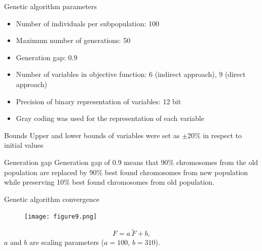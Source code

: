 \documentclass[10pt]{beamer} %
\begin{document}
\begin{frame}[t,label=frame24]{Genetic algorithm parameters}
\begin{itemize}
	\item Number of individuals per subpopulation: 100
	\item Maximum number of generations: 50
	\item Generation gap: 0.9
	\item Number of variables in objective function: 6 (indirect approach), 9 (direct approach)
	\item Precision of binary representation of variables: 12 bit
	\item Gray coding was used for the representation of each variable
\end{itemize}
\vspace{6pt}
\begin{alertblock}{Bounds}
	Upper and lower bounds of variables were set as  $\pm$20\% in respect to initial values
\end{alertblock}
\begin{block}{Generation gap}
	 Generation gap of 0.9 means that 90\% chromosomes from the old population are replaced by 90\% best found chromosomes from new population while preserving 10\% best found chromosomes from old population.
\end{block}
\end{frame}
\begin{frame}[c,label=frame25]{Genetic algorithm convergence}
	\begin{figure} [h!]
	\centering
	\texttt{[image: figure9.png]}
	\label{fig:GAconvergence}
\end{figure}
\begin{equation*}
F = a \,  \tilde{F} + b,
\end{equation*}
$a$ and $b$ are scaling parameters ($a=100$, $b=310$).
\end{frame}
\end{document}
